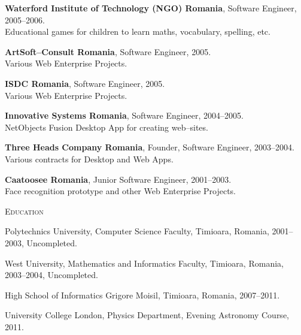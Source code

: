 \documentclass[10pt]{article}
\begin{document}
\begin{list}{}{\leftmargin=0em}
\item
{\bf Waterford Institute of Technology (NGO) Romania}, Software Engineer, 2005--2006.\\
Educational games for children to learn maths, vocabulary, spelling, etc.

\item
{\bf ArtSoft--Consult Romania}, Software Engineer, 2005.\\
Various Web Enterprise Projects.

\item
{\bf ISDC Romania}, Software Engineer, 2005.\\
Various Web Enterprise Projects.

\item
{\bf Innovative Systems Romania}, Software Engineer, 2004--2005.\\
NetObjects Fusion Desktop App for creating web--sites.

\item
{\bf Three Heads Company Romania}, Founder, Software Engineer, 2003--2004.\\
Various contracts for Desktop and Web Apps.

\item
{\bf Caatoosee Romania}, Junior Software Engineer, 2001--2003.\\
Face recognition prototype and other Web Enterprise Projects.

\end{list}

\newpage

\vspace{0.16in}

\noindent
\textcolor{Primary}{{\large \textsc{Education}}}
\begin{list}{}{\leftmargin=0em}
  \setlength{\itemsep}{1pt}
  \setlength{\parskip}{0pt}
  \setlength{\parsep}{0pt}
  \item Polytechnics University, Computer Science Faculty, Timioara, Romania, 2001--2003, Uncompleted.
  \item West University, Mathematics and Informatics Faculty, Timioara, Romania, 2003--2004, Uncompleted.
  \item High School of Informatics Grigore Moisil, Timioara, Romania, 2007--2011.
  \item University College London, Physics Department, Evening Astronomy Course, 2011.
\end{list}

\vspace{0.16in}
\end{document}
